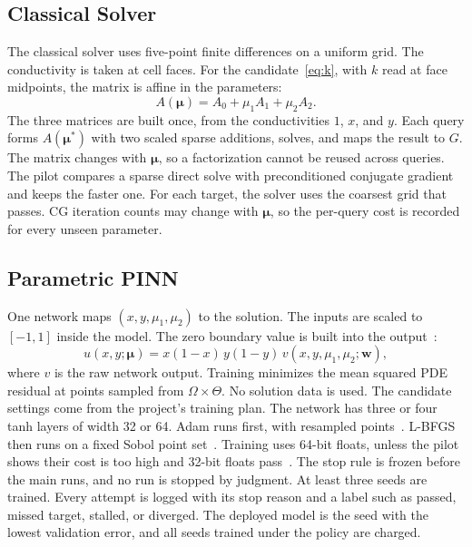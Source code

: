 \documentclass[conference]{IEEEtran}
\begin{document}
\subsection{Classical Solver}
The classical solver uses five-point finite differences on a uniform grid. The conductivity is taken at cell faces. For the candidate~\eqref{eq:k}, with $k$ read at face midpoints, the matrix is affine in the parameters:
\begin{equation}
A(\boldsymbol{\mu})=A_0+\mu_1A_1+\mu_2A_2 .
\label{eq:affine}
\end{equation}
The three matrices are built once, from the conductivities $1$, $x$, and $y$. Each query forms $A(\boldsymbol{\mu}^\ast)$ with two scaled sparse additions, solves, and maps the result to $G$. The matrix changes with $\boldsymbol{\mu}$, so a factorization cannot be reused across queries. The pilot compares a sparse direct solve with preconditioned conjugate gradient and keeps the faster one. For each target, the solver uses the coarsest grid that passes. CG iteration counts may change with $\boldsymbol{\mu}$, so the per-query cost is recorded for every unseen parameter.

\subsection{Parametric PINN}
One network maps $(x,y,\mu_1,\mu_2)$ to the solution. The inputs are scaled to $[-1,1]$ inside the model. The zero boundary value is built into the output~\cite{sukumar2022,sun2020}:
\begin{equation}
\hat u(x,y;\boldsymbol{\mu})=x(1-x)\,y(1-y)\,v(x,y,\mu_1,\mu_2;\mathbf{w}),
\label{eq:hard}
\end{equation}
where $v$ is the raw network output. Training minimizes the mean squared PDE residual at points sampled from $\Omega\times\Theta$. No solution data is used. The candidate settings come from the project's training plan. The network has three or four tanh layers of width 32 or 64. Adam runs first, with resampled points~\cite{wu2023}. L-BFGS then runs on a fixed Sobol point set~\cite{rathore2024}. Training uses 64-bit floats, unless the pilot shows their cost is too high and 32-bit floats pass~\cite{xu2025}. The stop rule is frozen before the main runs, and no run is stopped by judgment. At least three seeds are trained. Every attempt is logged with its stop reason and a label such as passed, missed target, stalled, or diverged. The deployed model is the seed with the lowest validation error, and all seeds trained under the policy are charged.
\end{document}
